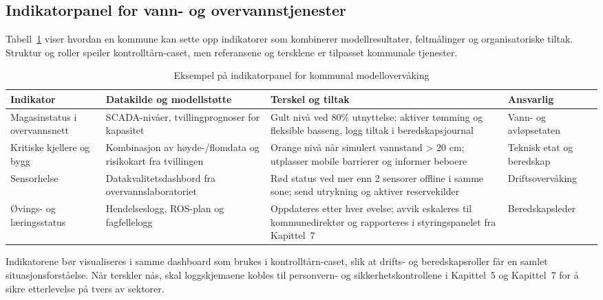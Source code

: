 \subsection{Indikatorpanel for vann- og overvannstjenester}
Tabell~\ref{tab:kommunaleindikatorer} viser hvordan en kommune kan sette opp indikatorer som kombinerer modellresultater, feltmålinger og organisatoriske tiltak. Struktur og roller speiler kontrolltårn-caset, men referansene og tersklene er tilpasset kommunale tjenester.

\begin{table}[ht]
    \centering
    \caption{Eksempel på indikatorpanel for kommunal modellovervåking}
    \label{tab:kommunaleindikatorer}
    \begin{tabular}{|p{3.2cm}|p{4.6cm}|p{4.4cm}|p{3.0cm}|}
        \hline
        \textbf{Indikator} & \textbf{Datakilde og modellstøtte} & \textbf{Terskel og tiltak} & \textbf{Ansvarlig} \\
        \hline
        Magasinstatus i overvannsnett & SCADA-nivåer, tvillingprognoser for kapasitet \citep{oslo2023overvann} & Gult nivå ved 80\% utnyttelse; aktiver tømming og fleksible basseng, logg tiltak i beredskapsjournal & Vann- og avløpsetaten \\
        \hline
        Kritiske kjellere og bygg & Kombinasjon av høyde-/flomdata og risikokart fra tvillingen \citep{nve2022kommunal} & Orange nivå når simulert vannstand \textgreater{} 20 cm; utplasser mobile barrierer og informer beboere & Teknisk etat og beredskap \\
        \hline
        Sensorhelse & Datakvalitetsdashbord fra overvannslaboratoriet \citep{asplan2023overvannslab} & Rød status ved mer enn 2 sensorer offline i samme sone; send utrykning og aktiver reservekilder & Driftsovervåking \\
        \hline
        Øvings- og læringsstatus & Hendelseslogg, ROS-plan og fagfellelogg & Oppdateres etter hver øvelse; avvik eskaleres til kommunedirektør og rapporteres i styringspanelet fra Kapittel~7 & Beredskapsleder \\
        \hline
    \end{tabular}
\end{table}

Indikatorene bør visualiseres i samme dashboard som brukes i kontrolltårn-caset, slik at drifts- og beredskapsroller får en samlet situasjonsforståelse. Når terskler nås, skal loggskjemaene kobles til personvern- og sikkerhetskontrollene i Kapittel~5 og Kapittel~7 for å sikre etterlevelse på tvers av sektorer.

